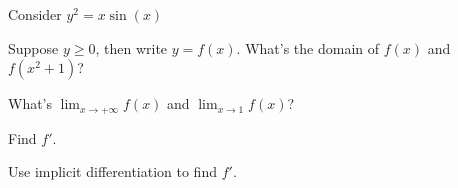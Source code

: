 \documentclass[Calculus 1 Recitation.tex]{subfiles}
\begin{document}
Consider $y^2=x\sin(x)$ 

\begin{myleftlinebox}
	Suppose $y\geq0$, then write $y=f(x)$. What's the domain of $f(x)$ and $f(x^2+1)$?
	\tcblower
	\vspace{2em}
\end{myleftlinebox}

\begin{myleftlinebox}
	What's $\lim_{x\to +\infty} f(x)$ and $\lim_{x\to 1}f(x)$?
	\tcblower
	\vspace{2em}
\end{myleftlinebox}

\begin{myleftlinebox}
	Find $f'$.
	\tcblower
	\vspace{2em}
\end{myleftlinebox}

\begin{myleftlinebox}
	Use implicit differentiation to find $f'$.
	\tcblower
	\vspace{2em}
\end{myleftlinebox}
\end{document}
